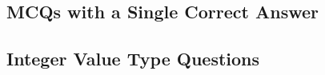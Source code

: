 \subsection*{MCQs with a Single Correct Answer}
\begin{enumerate}[label=\thechapter.\arabic*,ref=\thechapter.\theenumi]





\end{enumerate}
\subsection*{Integer Value Type Questions}
\begin{enumerate}[label=\thechapter.\arabic*,ref=\thechapter.\theenumi]




\end{enumerate}

